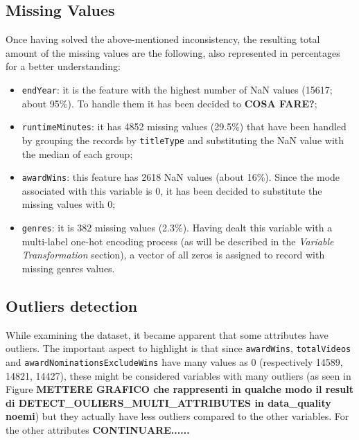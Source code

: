 \subsection{Missing Values}
Once having solved the above-mentioned inconsistency, the resulting total amount of the missing values are the following, also represented in percentages for a better understanding:
\begin{itemize}
    \item \texttt{endYear}: it is the feature with the highest number of NaN values (15617; about 95\%). To handle them it has been decided to \textbf{COSA FARE?};
    
    \item \texttt{runtimeMinutes}: it has 4852 missing values (29.5\%) that have been handled by grouping the records by \texttt{titleType} and substituting the NaN value with the median of each group;
    
    \item \texttt{awardWins}: this feature has 2618 NaN values (about 16\%). Since the mode associated with this variable is 0, it has been decided to substitute the missing values with 0;

    \item \texttt{genres}: it is 382 missing values (2.3\%). Having dealt this variable with a multi-label one-hot encoding process (as will be described in the \textit{Variable Transformation} section), a vector of all zeros is assigned to record with missing genres values.
\end{itemize}



\subsection{Outliers detection}
While examining the dataset, it became apparent that some attributes have outliers. 
The important aspect to highlight is that since \texttt{awardWins}, \texttt{totalVideos} and \texttt{awardNominationsExcludeWins} have many values as 0 (respectively 14589, 14821, 14427), 
these might be considered variables with many outliers (as seen in Figure \textbf{METTERE GRAFICO che rappresenti in qualche modo il result di DETECT\_OULIERS\_MULTI\_ATTRIBUTES in data\_quality noemi}) but they actually have less outliers compared to the other variables.
For the other attributes \textbf{CONTINUARE......}


